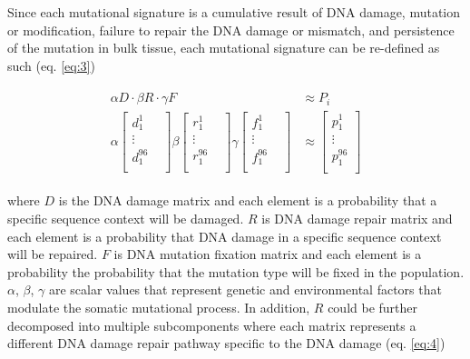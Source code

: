 Since each mutational signature is a cumulative result of DNA damage, mutation or modification, failure to repair the DNA damage or mismatch, and persistence of the mutation in bulk tissue, each mutational signature can be re-defined as such (eq. \ref{eq:3})

\begin{align}
\begin{split} 
\alpha D \cdot \beta R \cdot \gamma F &\approx P_{i} \label{eq:3} \\
\alpha \begin{bmatrix}
    d^{1}_{1}  \\
    \vdots &  \\
    d^{96}_{1}  \\
\end{bmatrix} 
\beta \begin{bmatrix}
    r^{1}_{1} \\
    \vdots &  \\
    r^{96}_{1} \\
\end{bmatrix} 
\gamma \begin{bmatrix}
    f^{1}_{1}  \\
    \vdots &  \\
    f^{96}_{1}  \\
\end{bmatrix} &\approx
\begin{bmatrix}
    p^{1}_{1} \\
    \vdots \\
    p^{96}_{1} \\
\end{bmatrix}
\end{split}
\end{align}


where $D$ is the DNA damage matrix and each element is a probability that a specific sequence context will be damaged. $R$ is DNA damage repair matrix and each element is a probability that DNA damage in a specific sequence context will be repaired. $F$ is DNA mutation fixation matrix and each element is a probability the probability that the mutation type will be fixed in the population. $\alpha$, $\beta$, $\gamma$ are scalar values that represent genetic and environmental factors that modulate the somatic mutational process. In addition, $R$ could be further decomposed into multiple subcomponents where each matrix represents a different DNA damage repair pathway specific to the DNA damage (eq. \ref{eq:4})

